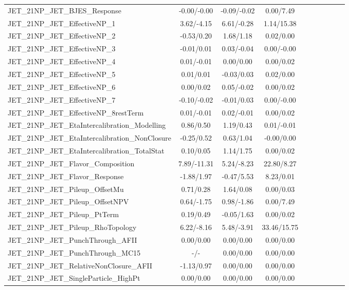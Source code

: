 \begin{table}[h]
\begin{center}
\begin{tabular}{l|ccccccccc}
JET\_21NP\_JET\_BJES\_Response &-0.00/-0.00 &-0.09/-0.02 &0.00/7.49 \\
JET\_21NP\_JET\_EffectiveNP\_1 &3.62/-4.15 &6.61/-0.28 &1.14/15.38 \\
JET\_21NP\_JET\_EffectiveNP\_2 &-0.53/0.20 &1.68/1.18 &0.02/0.00 \\
JET\_21NP\_JET\_EffectiveNP\_3 &-0.01/0.01 &0.03/-0.04 &0.00/-0.00 \\
JET\_21NP\_JET\_EffectiveNP\_4 &0.01/-0.01 &0.00/0.00 &0.00/0.02 \\
JET\_21NP\_JET\_EffectiveNP\_5 &0.01/0.01 &-0.03/0.03 &0.02/0.00 \\
JET\_21NP\_JET\_EffectiveNP\_6 &0.00/0.02 &0.05/-0.02 &0.00/0.02 \\
JET\_21NP\_JET\_EffectiveNP\_7 &-0.10/-0.02 &-0.01/0.03 &0.00/-0.00 \\
JET\_21NP\_JET\_EffectiveNP\_8restTerm &0.01/-0.01 &0.02/-0.01 &0.00/0.02 \\
JET\_21NP\_JET\_EtaIntercalibration\_Modelling &0.86/0.50 &1.19/0.43 &0.01/-0.01 \\
JET\_21NP\_JET\_EtaIntercalibration\_NonClosure &-0.25/0.52 &0.63/1.04 &-0.00/0.00 \\
JET\_21NP\_JET\_EtaIntercalibration\_TotalStat &0.10/0.05 &1.14/1.75 &0.00/0.02 \\
JET\_21NP\_JET\_Flavor\_Composition &7.89/-11.31 &5.24/-8.23 &22.80/8.27 \\
JET\_21NP\_JET\_Flavor\_Response &-1.88/1.97 &-0.47/5.53 &8.23/0.01 \\
JET\_21NP\_JET\_Pileup\_OffsetMu &0.71/0.28 &1.64/0.08 &0.00/0.03 \\
JET\_21NP\_JET\_Pileup\_OffsetNPV &0.64/-1.75 &0.98/-1.86 &0.00/7.49 \\
JET\_21NP\_JET\_Pileup\_PtTerm &0.19/0.49 &-0.05/1.63 &0.00/0.02 \\
JET\_21NP\_JET\_Pileup\_RhoTopology &6.22/-8.16 &5.48/-3.91 &33.46/15.75 \\
JET\_21NP\_JET\_PunchThrough\_AFII &0.00/0.00 &0.00/0.00 &0.00/0.00 \\
JET\_21NP\_JET\_PunchThrough\_MC15 &-/- &0.00/0.00 &0.00/0.00 \\
JET\_21NP\_JET\_RelativeNonClosure\_AFII &-1.13/0.97 &0.00/0.00 &0.00/0.00 \\
JET\_21NP\_JET\_SingleParticle\_HighPt &0.00/0.00 &0.00/0.00 &0.00/0.00 \\
\hline
\end{tabular}
\end{center}
\end{table}
